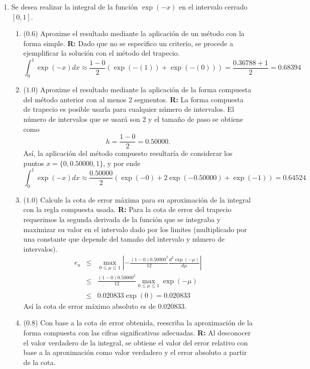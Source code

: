 \documentclass[12pt]{article}
\begin{document}
\vspace{-.5cm}
  \begin{enumerate}[leftmargin=*,widest=9]
    \item Se desea realizar la integral de la función \(\exp(-x)\) en el intervalo cerrado \(\left[0, 1\right]\).
    \begin{enumerate}[label=\alph*]
    \item (\(0.6\)) Aproxime el resultado mediante la aplicación de un método con la forma simple.
		\textbf{R:} Dado que no se especifico un criterio, se procede a ejemplificar la solución con el método del trapecio.
    \[
    \int_{0}^{1}\exp(-x)dx \approx \frac{1-0}{2}(\exp(-(1)) + \exp(-(0)))=\frac{0.36788 + 1}{2}=0.68394
    \]
    \item (\(1.0\)) Aproxime el resultado mediante la aplicación de la forma compuesta del método anterior con al menos 2 segmentos.
		\textbf{R:} La forma compuesta de trapecio es posible usarla para cualquier número de intervalos. El número de intervalos que se usará son 2 y el tamaño de paso se obtiene como
    \[
    h = \frac{1-0}{2} = 0.50000.
    \]
    Así, la aplicación del método compuesto resultaría de considerar los puntos \( x=\lbrace 0, 0.50000, 1 \rbrace \), y por ende
    \[
    \int_{0}^{1}\exp(-x)dx \approx \frac{0.50000}{2}(\exp(-0)+2\exp(-0.50000)+\exp(-1))=0.64524
    \]
    \item (\(1.0\)) Calcule la cota de error máxima para su aproximación de la integral con la regla compuesta usada.
		\textbf{R:} Para la cota de error del trapecio requerimos la segunda derivada de la función que se integraba y maximizar su valor en el intervalo dado por los limites (multiplicado por una constante que depende del tamaño del intervalo y número de intervalos).
    \begin{eqnarray*}
e_a &\leq& \max_{0\leq\mu\leq 1}\left\vert -\frac{(1-0)0.50000^2}{12} \frac{d^2\exp(-\mu)}{d\mu} \right\vert \\
& \leq& \frac{(1-0)0.50000^2}{12}\max_{0\leq\mu\leq 1}\exp(-\mu) \\
&\leq & 0.020833 \exp(0) = 0.020833
    \end{eqnarray*}
    Así la cota de error máximo absoluto es de \(0.020833\).
    \item (\(0.8\)) Con base a la cota de error obtenida, reescriba la aproximación de la forma compuesta con las cifras significativas adecuadas.
    \textbf{R:} Al desconocer el valor verdadero de la integral, se obtiene el valor del error relativo con base a la aproximación como valor verdadero y el error absoluto a partir de la cota.

\end{enumerate}
\end{enumerate}
\end{document}
